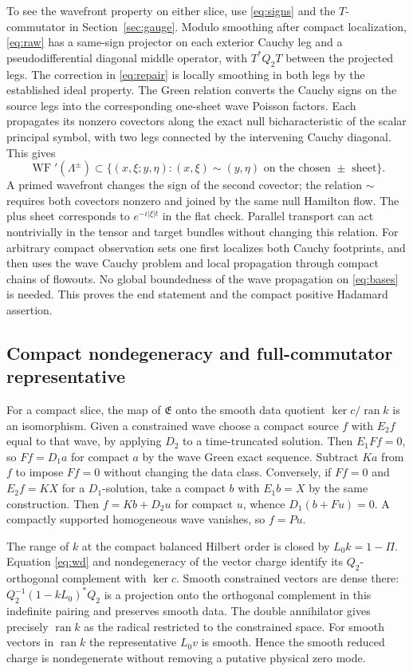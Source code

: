 \documentclass[11pt]{article}
\newcommand{\ran}{\operatorname{ran}}
\newcommand{\WF}{\operatorname{WF}}
\begin{document}
To see the wavefront property on either slice, use \eqref{eq:signs} and the \(T\)-commutator in Section~\ref{sec:gauge}. Modulo smoothing after compact localization, \eqref{eq:raw} has a same-sign projector on each exterior Cauchy leg and a pseudodifferential diagonal middle operator, with \(T^*Q_2T\) between the projected legs. The correction in \eqref{eq:repair} is locally smoothing in both legs by the established ideal property. The Green relation converts the Cauchy signs on the source legs into the corresponding one-sheet wave Poisson factors. Each propagates its nonzero covectors along the exact null bicharacteristic of the scalar principal symbol, with two legs connected by the intervening Cauchy diagonal. This gives
\[
 \WF'(\Lambda^\pm)\subset
 \{(x,\xi;y,\eta): (x,\xi)\sim(y,\eta)
       \text{ on the chosen }\pm\text{ sheet}\}.
\]
A primed wavefront changes the sign of the second covector; the relation \(\sim\) requires both covectors nonzero and joined by the same null Hamilton flow. The plus sheet corresponds to \(e^{-i|\xi|t}\) in the flat check. Parallel transport can act nontrivially in the tensor and target bundles without changing this relation. For arbitrary compact observation sets one first localizes both Cauchy footprints, and then uses the wave Cauchy problem and local propagation through compact chains of flowouts. No global boundedness of the wave propagation on \eqref{eq:bases} is needed. This proves the end statement and the compact positive Hadamard assertion.

\subsection{Compact nondegeneracy and full-commutator representative}

For a compact slice, the map of \(\mathfrak E\) onto the smooth data quotient \(\ker c/\ran k\) is an isomorphism. Given a constrained wave choose a compact source \(f\) with \(E_2 f\) equal to that wave, by applying \(D_2\) to a time-truncated solution. Then \(E_1Ff=0\), so \(Ff=D_1 a\) for compact \(a\) by the wave Green exact sequence. Subtract \(Ka\) from \(f\) to impose \(Ff=0\) without changing the data class. Conversely, if \(Ff=0\) and \(E_2 f=KX\) for a \(D_1\)-solution, take a compact \(b\) with \(E_1b=X\) by the same construction. Then \(f=Kb+D_2u\) for compact \(u\), whence \(D_1(b+Fu)=0\). A compactly supported homogeneous wave vanishes, so \(f=Pu\).

The range of \(k\) at the compact balanced Hilbert order is closed by \(L_0k=1-\Pi\). Equation \eqref{eq:wd} and nondegeneracy of the vector charge identify its \(Q_2\)-orthogonal complement with \(\ker c\). Smooth constrained vectors are dense there: \(Q_2^{-1}(1-kL_0)^*Q_2\) is a projection onto the orthogonal complement in this indefinite pairing and preserves smooth data. The double annihilator gives precisely \(\ran k\) as the radical restricted to the constrained space. For smooth vectors in \(\ran k\) the representative \(L_0 v\) is smooth. Hence the smooth reduced charge is nondegenerate without removing a putative physical zero mode.
\end{document}

